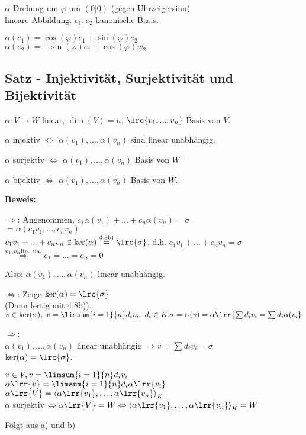   $\alpha$ Drehung um $\varphi$ um $(0|0)$ (gegen Uhrzeigersinn)\\
  lineare Abbildung. $e_1,e_2$ kanonische Basis.

  $\alpha(e_1)=\cos(\varphi)e_1+\sin(\varphi)e_2$\\
  $\alpha(e_2)=-\sin(\varphi)e_1+\cos(\varphi)w_2$

  \subsection{Satz - Injektivität, Surjektivität und Bijektivität}

  $\alpha:V\rightarrow W$ linear, $\dim(V)=n$, $\lrc{v_1,...,v_n}$ Basis von $V$.

    \item $\alpha$ injektiv $\Leftrightarrow$ $\alpha(v_1),...,\alpha(v_n)$
      sind linear unabhängig.
    \item $\alpha$ surjektiv $\Leftrightarrow$ $\alpha(v_1),...,\alpha(v_n)$
      Basis von $W$
    \item $\alpha$ bijektiv $\Leftrightarrow$ $\alpha(v_1),...,\alpha(v_n)$
      Basis von $W$.
  \subExEnd

  \textbf{Beweis:}
    \item
      $\Rightarrow$: Angenommen, $c_1\alpha(v_1)+...+c_n\alpha(v_n)=\sigma$\\
      $=\alpha(c_1v_1,...,c_nv_n)$\\
      $c_1v_1+...+c_nv_n\in\mbox{ker}(\alpha)\overset{\mbox{\scriptsize 4.8b)}}{=}\lrc{\sigma}$, d.h. $c_1v_1+...+c_nv_n=\sigma$\\
      $\overset{v_1,v_n\mbox{\scriptsize lin. ua.}}{\Rightarrow} c_1=...=c_n=0$

      Also: $\alpha(v_1),\dots,\alpha(v_n)$ linear unabhängig.

      $\Leftrightarrow$: Zeige $\mbox{ker}(\alpha)=\lrc{\sigma}$\\
      (Dann fertig mit 4.8b)).\\
      $v\in\mbox{ker}(\alpha),\ v=\limsum{i=1}{n}d_iv_i,\ d_i\in K.\\
      \sigma=\alpha(v)=\alpha\lrr{\sum d_iv_i=\sum d_i\alpha(v_i}$

      $\Rightarrow$:\\
      $\alpha(v_1),...,\alpha(v_n)$ linear unabhängig $\Rightarrow v=\sum
      d_iv_i=\sigma$\\
      $\mbox{ker}(\alpha)=\lrc{\sigma}$.
     \item $v\in V, v=\limsum{i=1}{n}d_iv_i$\\
		$\alpha\lrr{v}=\limsum{i=1}{n}d_i\alpha\lrr{v_i}$\\
		$\alpha\lrr{V}=\left\langle\alpha\lrr{v_1},\dots,\alpha\lrr{v_n}\right\rangle_K$\\
		$\alpha$ surjektiv $\Leftrightarrow \alpha\lrr{V}=W \Leftrightarrow\left\langle\alpha\lrr{v_1},\dots,\alpha\lrr{v_n}\right\rangle_K=W$
	 \item Folgt aus a) und b)
	\subExEnd
	
